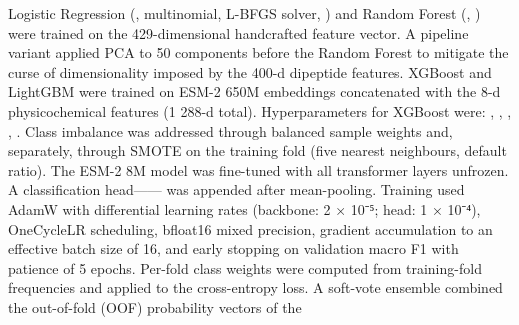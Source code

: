 {} Logistic Regression (, multinomial, L-BFGS\markdownRendererSoftLineBreak
{}solver, ) and Random Forest (, )\markdownRendererSoftLineBreak
{}were trained on the 429-dimensional handcrafted feature vector. A pipeline variant applied\markdownRendererSoftLineBreak
{}PCA to 50 components before the Random Forest to mitigate the curse of dimensionality imposed\markdownRendererSoftLineBreak
{}by the 400-d dipeptide features.\markdownRendererParagraphSeparator
{} XGBoost and LightGBM were trained on ESM-2 650M embeddings\markdownRendererSoftLineBreak
{}concatenated with the 8-d physicochemical features (1 288-d total). Hyperparameters for\markdownRendererSoftLineBreak
{}XGBoost were: , , , ,\markdownRendererSoftLineBreak
{}. Class imbalance was addressed through balanced sample weights and,\markdownRendererSoftLineBreak
{}separately, through SMOTE on the training fold (five nearest neighbours, default ratio).\markdownRendererParagraphSeparator
{} The ESM-2 8M model was fine-tuned with all transformer layers\markdownRendererSoftLineBreak
{}unfrozen. A classification head——\markdownRendererSoftLineBreak
{}was appended after mean-pooling. Training used AdamW with differential learning rates\markdownRendererSoftLineBreak
{}(backbone: 2 × 10⁻⁵; head: 1 × 10⁻⁴), OneCycleLR scheduling, bfloat16 mixed precision,\markdownRendererSoftLineBreak
{}gradient accumulation to an effective batch size of 16, and early stopping on validation\markdownRendererSoftLineBreak
{}macro F1 with patience of 5 epochs. Per-fold class weights were computed from training-fold\markdownRendererSoftLineBreak
{}frequencies and applied to the cross-entropy loss.\markdownRendererParagraphSeparator
{} A soft-vote ensemble combined the out-of-fold (OOF) probability vectors of the\markdownRendererSoftLineBreak
